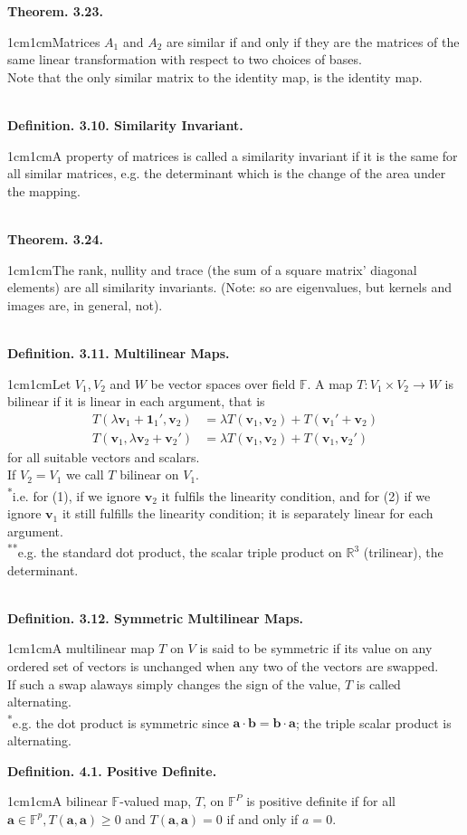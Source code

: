 \documentclass{article}
\newcommand{\vect}[1]{\mathbf{#1}}
\newcommand{\definition}[2]{\textbf{Definition. #1.}\begin{adjustwidth}{1cm}{1cm}#2\end{adjustwidth}}
\newcommand{\theorem}[2]{\textbf{Theorem. #1.}\begin{adjustwidth}{1cm}{1cm}#2\end{adjustwidth}}
\begin{document}
\theorem{3.23}{Matrices $A_1$ and $A_2$ are similar if and only if they are the matrices of the same linear transformation with respect to two choices of bases.\\[1\baselineskip]Note that the only similar matrix to the identity map, is the identity map.}~\\
\definition{3.10. Similarity Invariant}{A property of matrices is called a similarity invariant if it is the same for all similar matrices, e.g. the determinant which is the change of the area under the mapping.}~\\
\theorem{3.24}{The rank, nullity and trace (the sum of a square matrix' diagonal elements) are all similarity invariants. (Note: so are eigenvalues, but kernels and images are, in general, not).}~\\
\definition{3.11. Multilinear Maps}{Let $V_1, V_2$ and $W$ be vector spaces over field $\mathbb{F}$. A map $T: V_1 \times V_2 \rightarrow W$ is bilinear if it is linear in each argument, that is \begin{align} T(\lambda \vect{v}_1 + {\vect{1}_1}', \vect{v}_2) &= \lambda T(\vect{v}_1, \vect{v}_2) + T( {\vect{v}_1}' + \vect{v}_2) \\ T(\vect{v}_1, \lambda \vect{v}_2 + { \vect{v}_2 }') &= \lambda T (\vect{v}_1 , \vect{v}_2 ) + T ( \vect{v}_1, { \vect{v}_2 }') \end{align} for all suitable vectors and scalars.\\If $V_2 = V_1$ we call $T$ bilinear on $V_1$.\\[\baselineskip]\textsuperscript{*}i.e. for (1), if we ignore $\vect{v}_2$ it fulfils the linearity condition, and for (2) if we ignore $\vect{v}_1$ it still fulfills the linearity condition; it is separately linear for each argument.\\[\baselineskip]\textsuperscript{**}e.g. the standard dot product, the scalar triple product on $\mathbb{R}^3$ (trilinear), the determinant.}~\\
\definition{3.12. Symmetric Multilinear Maps}{A multilinear map $T$ on $V$ is said to be symmetric if its value on any ordered set of vectors is unchanged when any two of the vectors are swapped.\\If such a swap alaways simply changes the sign of the value, $T$ is called alternating.\\[1\baselineskip]\textsuperscript{*}e.g. the dot product is symmetric since $\vect{a} \cdot \vect{b} = \vect{b} \cdot \vect{a}$; the triple scalar product is alternating.}\newpage
\definition{4.1. Positive Definite}{A bilinear $\mathbb{F}$-valued map, $T$, on $\mathbb{F}^P$ is positive definite if for all $\vect{a} \in \mathbb{F}^p, T(\vect{a}, \vect{a}) \geq 0$ and $T(\vect{a}, \vect{a}) = 0$ if and only if $a = 0$.}~\\
\end{document}
